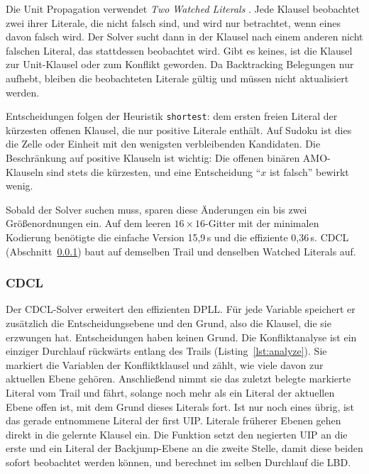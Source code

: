 Die Unit Propagation verwendet \emph{Two Watched Literals} .
Jede Klausel beobachtet zwei ihrer Literale, die nicht falsch sind, und wird nur betrachtet, wenn eines davon falsch wird.
Der Solver sucht dann in der Klausel nach einem anderen nicht falschen Literal, das stattdessen beobachtet wird.
Gibt es keines, ist die Klausel zur Unit-Klausel oder zum Konflikt geworden.
Da Backtracking Belegungen nur aufhebt, bleiben die beobachteten Literale gültig und müssen nicht aktualisiert werden.

Entscheidungen folgen der Heuristik \texttt{shortest}: dem ersten freien Literal der kürzesten offenen Klausel, die nur positive Literale enthält.
Auf Sudoku ist dies die Zelle oder Einheit mit den wenigsten verbleibenden Kandidaten.
Die Beschränkung auf positive Klauseln ist wichtig: Die offenen binären \acs{AMO}-Klauseln sind stets die kürzesten, und eine Entscheidung \enquote{$x$ ist falsch} bewirkt wenig.

Sobald der Solver suchen muss, sparen diese Änderungen ein bis zwei Größenordnungen ein.
Auf dem leeren $16 \times 16$-Gitter mit der minimalen Kodierung benötigte die einfache Version 15,9\,s und die effiziente 0,36\,s.
\acs{CDCL} (Abschnitt~\ref{sec:cdcl-impl}) baut auf demselben Trail und denselben Watched Literals auf.

\subsubsection{CDCL} \label{sec:cdcl-impl}

Der \acs{CDCL}-Solver erweitert den effizienten DPLL.
Für jede Variable speichert er zusätzlich die Entscheidungsebene und den Grund, also die Klausel, die sie erzwungen hat. Entscheidungen haben keinen Grund.
Die Konfliktanalyse ist ein einziger Durchlauf rückwärts entlang des Trails (Listing~\ref{lst:analyze}).
Sie markiert die Variablen der Konfliktklausel und zählt, wie viele davon zur aktuellen Ebene gehören.
Anschließend nimmt sie das zuletzt belegte markierte Literal vom Trail und fährt, solange noch mehr als ein Literal der aktuellen Ebene offen ist, mit dem Grund dieses Literals fort.
Ist nur noch eines übrig, ist das gerade entnommene Literal der first \acs{UIP}.
Literale früherer Ebenen gehen direkt in die gelernte Klausel ein.
Die Funktion setzt den negierten \acs{UIP} an die erste und ein Literal der Backjump-Ebene an die zweite Stelle, damit diese beiden sofort beobachtet werden können, und berechnet im selben Durchlauf die \acs{LBD}.

